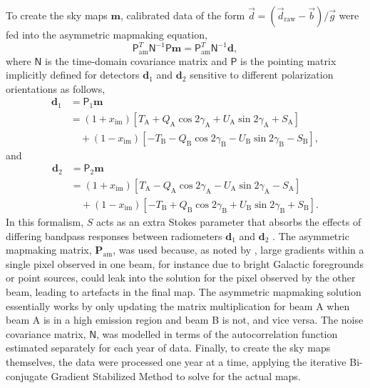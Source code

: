 \documentclass[twocolumn]{../../common/aa}
\newcommand{\dv}[0]{\vec{d}}
\newcommand{\A}[0]{\mathrm{A}}
\newcommand{\B}[0]{\mathrm{B}}
\newcommand{\bv}[0]{\vec{b}}
\newcommand{\g}[0]{\vec{g}}
\begin{document}
To create the sky maps $\boldsymbol m$, calibrated data of the form $\dv = (\dv_{\mathrm{raw}}-\bv)/\g$ were fed into the asymmetric mapmaking equation,
\begin{equation}
	\mathsf P_\mathrm{am}^T\mathsf N^{-1}\mathsf P\boldsymbol m=\mathsf P^T_\mathrm{am}\mathsf N^{-1}\boldsymbol d,
\end{equation}
where $\mathsf N$ is the time-domain covariance matrix and $\mathsf P$ is the pointing matrix implicitly defined for detectors $\boldsymbol d_1$ and $\boldsymbol d_2$ sensitive to different polarization orientations as follows,
\begin{align}
	\boldsymbol d_1&=\mathsf P_1\boldsymbol m
	\nonumber
	\\
	&=(1+x_\mathrm{im})[T_\A+Q_\A\cos2\gamma_\A+U_\A\sin2\gamma_\A+S_\A]
	\nonumber
	\\
	&\quad+(1-x_\mathrm{im})[-T_\B-Q_\B\cos2\gamma_\B-U_\B\sin2\gamma_\B-S_\B],
\end{align}
and
\begin{align}
	\boldsymbol d_2&=\mathsf P_2\boldsymbol m
	\nonumber
	\\
	&=(1+x_\mathrm{im})[T_\A-Q_\A\cos2\gamma_\A-U_\A\sin2\gamma_\A-S_\A]
	\nonumber
	\\
	&\quad+(1-x_\mathrm{im})[-T_\B+Q_\B\cos2\gamma_\B+U_\B\sin2\gamma_\B+S_\B].
\end{align}
In this formalism, $S$ acts as an extra Stokes parameter that absorbs the effects of differing bandpass responses between radiometers $\boldsymbol d_1$ and $\boldsymbol d_2$ \citep{jarosik2007}.
The asymmetric mapmaking matrix, $\boldsymbol P_\mathrm{am}$, was used because, as noted by \citet{jarosik2010}, large gradients within a single pixel observed in one beam, for instance due to bright Galactic foregrounds or point sources, could leak into the solution for the pixel observed by the other beam, leading to artefacts in the final map. The asymmetric mapmaking solution essentially works by only updating the matrix multiplication for beam A when beam A is in a high emission region and beam B is not, and vice versa. %
The noise covariance matrix, $\mathsf N$, was modelled in terms of the autocorrelation function estimated separately for each year of data.
Finally, to create the sky maps themselves, the data were processed one year at a time, applying the iterative Bi-conjugate Gradient Stabilized Method \citep[BiCG-STAB][]{bicgstab,bicgstab_template} to solve for the actual maps.
\end{document}
